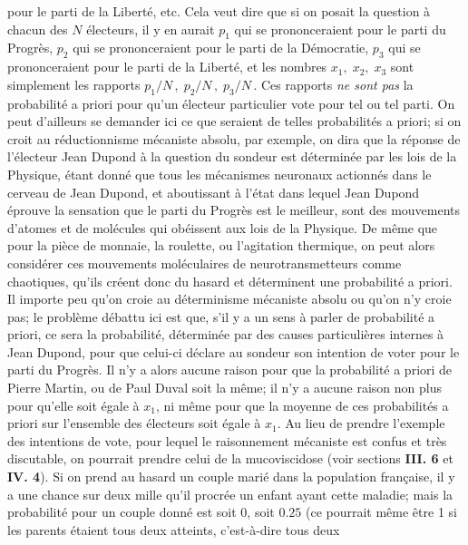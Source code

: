 pour le parti de la Libert\'e, etc. Cela veut dire que si on posait la 
question \`a chacun des $N$ \'electeurs, il y en aurait $p_1$ qui se 
prononceraient pour le parti du Progr\`es, $p_2$ qui se prononceraient 
pour le parti de la D\'emocratie, $p_3$ qui se prononceraient pour le 
parti de la Libert\'e, et les nombres $x_1,\; x_2,\; x_3$ sont 
simplement les rapports $p_1 / N \, , \; p_2 / N \, , \; p_3 / N \,$. 
\medskip
Ces rapports {\it ne sont pas} la probabilit\'e a priori pour 
qu'un \'electeur particulier vote pour tel ou tel parti. On peut d'ailleurs 
se demander ici ce que seraient de telles probabilit\'es a priori; si on 
croit au r\'eductionnisme m\'ecaniste absolu, par exemple, on dira que
la r\'eponse de l'\'electeur Jean Dupond \`a la question du sondeur est 
d\'etermin\'ee par les lois de la Physique, \'etant donn\'e que tous les 
m\'ecanismes neuronaux actionn\'es dans le cerveau de Jean Dupond, et 
aboutissant \`a l'\'etat dans lequel Jean Dupond \'eprouve la sensation 
que le parti du Progr\`es est le meilleur, sont des mouvements d'atomes 
et de mol\'ecules qui ob\'eissent aux lois de la Physique. De m\^eme 
que pour la pi\`ece de monnaie, la roulette, ou l'agitation thermique, on 
peut alors consid\'erer ces mouvements mol\'eculaires de 
neurotransmetteurs comme chaotiques, qu'ils cr\'eent donc du hasard
et d\'eterminent une probabilit\'e a priori. 
\medskip 
Il importe peu qu'on croie au d\'eterminisme m\'ecaniste absolu
ou qu'on n'y croie pas; le probl\`eme d\'ebattu ici est que, s'il y a un
sens \`a parler de probabilit\'e a priori, ce sera la probabilit\'e, 
d\'etermin\'ee par des causes particuli\`eres internes \`a Jean Dupond, 
pour que celui-ci d\'eclare au sondeur son intention de voter pour le 
parti du Progr\`es. Il n'y a alors aucune raison pour que la probabilit\'e a 
priori de Pierre Martin, ou de Paul Duval soit la m\^eme; il n'y a aucune 
raison non plus pour qu'elle soit \'egale \`a $x_1$, ni m\^eme pour que
la moyenne de ces probabilit\'es a priori sur l'ensemble des \'electeurs 
soit \'egale \`a $x_1$. Au lieu de prendre l'exemple des intentions de 
vote, pour lequel le raisonnement m\'ecaniste est confus et tr\`es 
discutable, on pourrait prendre celui de la mucoviscidose (voir sections 
{\bf III. 6} et {\bf IV. 4}). Si on prend au hasard un couple mari\'e 
dans la population fran\c{c}aise, il y a une chance sur deux mille qu'il
procr\'ee un enfant ayant cette maladie; mais la probabilit\'e pour 
un couple donn\'e est soit $0$, soit $0.25$ (ce pourrait m\^eme \^etre 1 
si les parents \'etaient tous deux atteints, c'est-\`a-dire tous deux
